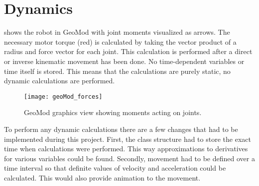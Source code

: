 \label{Part}

\section{Dynamics}

 shows the robot in GeoMod with joint moments visualized as arrows. The necessary motor torque (red) is calculated by taking the vector product of a radius and force vector for each joint. This calculation is performed after a direct or inverse kinematic movement has been done. No time-dependent variables or time itself is stored. This means that the calculations are purely static, no dynamic calculations are performed.

\begin{figure}[h!]
    \centering
    \texttt{[image: geoMod\_forces]}
    \caption{GeoMod graphics view showing moments acting on joints.}
    \label{geoMod_forces}
\end{figure}

To perform any dynamic calculations there are a few changes that had to be implemented during this project. First, the class structure had to store the exact time when calculations were performed. This way approximations to derivatives for various variables could be found. Secondly, movement had to be defined over a time interval so that definite values of velocity and acceleration could be calculated. This would also provide animation to the movement.

